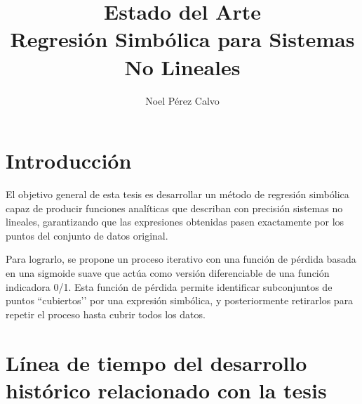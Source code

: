 \documentclass[12pt,a4paper]{article}
\title{Estado del Arte\\ \large Regresión Simbólica para Sistemas No Lineales} \author{Noel Pérez Calvo} \date{}
\begin{document}
\maketitle


\section*{Introducción}

El objetivo general de esta tesis es desarrollar un método de regresión simbólica capaz de producir funciones analíticas que describan con precisión sistemas no lineales, garantizando que las expresiones obtenidas pasen exactamente por los puntos del conjunto de datos original.

Para lograrlo, se propone un proceso iterativo con una función de pérdida basada en una sigmoide suave que actúa como versión diferenciable de una función indicadora 0/1. Esta función de pérdida permite identificar subconjuntos de puntos ``cubiertos’’ por una expresión simbólica, y posteriormente retirarlos para repetir el proceso hasta cubrir todos los datos.


\section*{Línea de tiempo del desarrollo histórico relacionado con la tesis}
\end{document}

